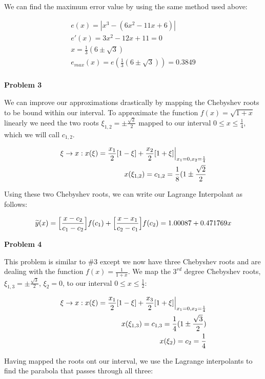 \documentclass[a4paper,12pt]{article}
\begin{document}
We can find the maximum error value by using the same method used above:

\begin{eqnarray*}
e(x)=|x^3-(6x^2-11x+6)|\\
e'(x)=3x^2-12x+11=0\\
x=\frac{1}{3}(6 \pm \sqrt{3})\\
e_{max}(x)=e(\frac{1}{3}(6 \pm \sqrt{3}))=0.3849 \\
\end{eqnarray*}

{\bf Problem  3}
\smallskip

We can improve our approximations drastically by mapping the Chebyshev roots to be bound within our interval. To approximate the function $f(x)=\sqrt{1+x}$ linearly we need the two roots $\xi_{1,2}=\pm \frac{\sqrt{2}}{2}$ mapped to our interval $0 \leq x \leq \frac{1}{4}$, which we will call $c_{1,2}$. 

\begin{eqnarray*}
\xi \rightarrow x: x(\xi)=\frac{x_1}{2}[1-\xi]+\frac{x_2}{2}[1+\xi] \Big{|}_{x_1=0,x_2=\frac{1}{4}} \\
x(\xi_{1,2})=c_{1,2}=\frac{1}{8}(1 \pm \frac{\sqrt{2}}{2}
\end{eqnarray*}

Using these two Chebyshev roots, we can write our Lagrange Interpolant as follows:

\begin{equation*}
\widetilde{y}(x)=\Big{[} \frac{x-c_2}{c_1-c_2} \Big{]} f(c_1) + \Big{[} \frac{x-x_1}{c_2-c_1} \Big{]} f(c_2) = 1.00087 + 0.471769 x
\end{equation*}

{\bf Problem  4}
\smallskip

This problem is similar to \#3 except we now have three Chebyshev roots and are dealing with the function $f(x)=\frac{1}{1+x}$. We map the $3^{rd}$ degree Chebyshev roots, $\xi_{1,3}=\pm \frac{\sqrt{3}}{2}$, $\xi_2=0$, to our interval $0 \leq x \leq \frac{1}{2}$:

\begin{eqnarray*}
\xi \rightarrow x: x(\xi)=\frac{x_1}{2}[1-\xi]+\frac{x_3}{2}[1+\xi] \Big{|}_{x_1=0,x_2=\frac{1}{4}} \\
x(\xi_{1,3})=c_{1,3}= \frac{1}{4}(1 \pm \frac{\sqrt{3}}{2})\\
x(\xi_2)=c_2=\frac{1}{4}
\end{eqnarray*}

Having mapped the roots ont our interval, we use the Lagrange interpolants to find the parabola that passes through all three:
\end{document}
